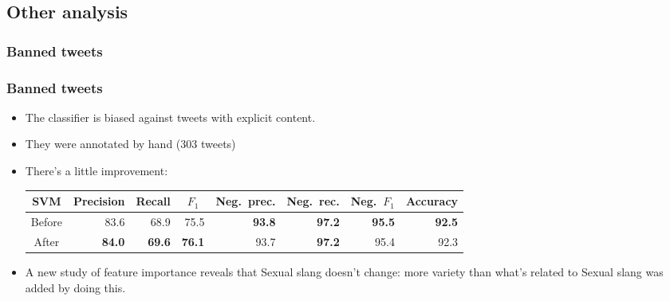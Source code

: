 \subsection{Other analysis}

\subsubsection{Banned tweets}
\begin{frame}
    \frametitle{Banned tweets}

    \begin{itemize}
        \item The classifier is biased against tweets with explicit content.
        \item They were annotated by hand (303 tweets)
        \item There's a little improvement:
        \begin{center}
            \scriptsize
            \begin{tabular}{ c r r r r r r r }
                \textbf{SVM} & \multicolumn{1}{c}{Precision} & \multicolumn{1}{c}{Recall} & \multicolumn{1}{c}{$F_1$} & \multicolumn{1}{c}{Neg.\ prec.} & \multicolumn{1}{c}{Neg.\ rec.} & \multicolumn{1}{c}{Neg.\ $F_1$} & \multicolumn{1}{c}{Accuracy} \\
                \midrule
                Before & 83.6 & 68.9 & 75.5 & \textbf{93.8} & \textbf{97.2} & \textbf{95.5} & \textbf{92.5} \\
                \midrule
                After & \textbf{84.0} & \textbf{69.6} & \textbf{76.1} & 93.7 & \textbf{97.2} & 95.4 & 92.3 \\
            \end{tabular}
        \end{center}
        \item A new study of feature importance reveals that Sexual slang doesn't change: more variety than what's related to Sexual slang was added by doing this.
    \end{itemize}
\end{frame}

